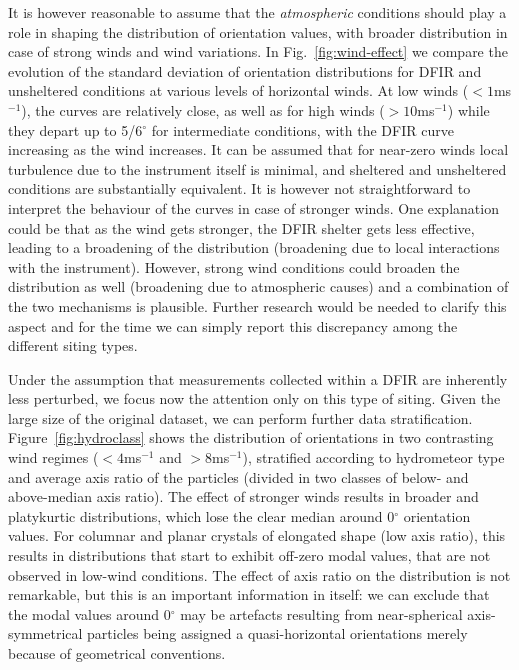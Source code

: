 \documentclass[draft]{agujournal2019}
\begin{document}
It is however reasonable to assume that the \textit{atmospheric} conditions should play a role in shaping the distribution of orientation values, with broader distribution in case of strong winds and wind variations. In Fig.~\ref{fig:wind-effect} we compare the evolution of the standard deviation of orientation distributions for DFIR and unsheltered conditions at various levels of horizontal winds. At low winds ($<1$ms$^{-1}$), the curves are relatively close, as well as for high winds ($>10$ms$^{-1}$) while they depart up to 5/6$^\circ$ for intermediate conditions, with the DFIR curve increasing as the wind increases. It can be assumed that for near-zero winds local turbulence due to the instrument itself is minimal, and sheltered and unsheltered conditions are substantially equivalent. It is however not straightforward to interpret the behaviour of the curves in case of stronger winds. One explanation could be that as the wind gets stronger, the DFIR shelter gets less effective, leading to a broadening of the distribution (broadening due to local interactions with the instrument). However, strong wind conditions could broaden the distribution as well (broadening due to atmospheric causes) and a combination of the two mechanisms is plausible. Further research would be needed to clarify this aspect and for the time we can simply report this discrepancy among the different siting types. 

Under the assumption that measurements collected within a DFIR are inherently less perturbed, we focus now the attention only on this type of siting. Given the large size of the original dataset, we can perform further data stratification. Figure~\ref{fig:hydroclass} shows the distribution of orientations in two contrasting wind regimes ($<4$ms$^{-1}$ and $>8$ms$^{-1}$), stratified according to hydrometeor type~\cite<method of>{Praz_AMT_2017} and average axis ratio of the particles (divided in two classes of below- and above-median axis ratio).  The effect of stronger winds results in broader and platykurtic distributions, which lose the clear median around 0$^\circ$ orientation values. For columnar and planar crystals of elongated shape (low axis ratio), this results in distributions that start to exhibit off-zero modal values, that are not observed in low-wind conditions. 
The effect of axis ratio on the distribution is not remarkable, but this is an important information in itself: we can exclude that the modal values around 0$^\circ$ may be artefacts resulting from near-spherical axis-symmetrical particles being assigned a quasi-horizontal orientations merely because of geometrical conventions. 
\end{document}
